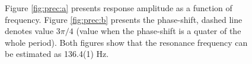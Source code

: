 \documentclass{llncs}
\begin{document}
\begin{figure}
\centering
\begin{minipage}{.47\linewidth}
\centering
{}
\end{minipage}
\begin{minipage}{.47\linewidth}
\centering
{}
\end{minipage}
\caption{Figure \ref{fig:prec:a} presents response amplitude as a function of frequency. Figure \ref{fig:prec:b} presents the phase-shift, dashed line denotes value $3\pi/4$ (value when the phase-shift is a quater of the whole period).
Both figures show that the resonance frequency can be estimated as 136.4(1) Hz.}
\label{fig:prec}
\end{figure}
\end{document}
